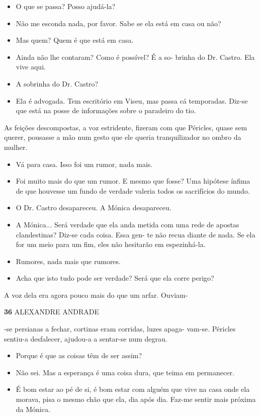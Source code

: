 \begin{itemize}
\tightlist
\item
  O que se passa? Posso ajudá-la?
\item
  Não me esconda nada, por favor. Sabe se ela está em casa ou não?
\item
  Mas quem? Quem é que está em casa.
\item
  Ainda não lhe contaram? Como é possível? É a so- brinha do Dr. Castro.
  Ela vive aqui.
\item
  A sobrinha do Dr. Castro?
\item
  Ela é advogada. Tem escritório em Viseu, mas passa cá temporadas.
  Diz-se que está na posse de informações sobre o paradeiro do tio.
\end{itemize}

As feições descompostas, a voz estridente, fizeram com que Péricles,
quase sem querer, pousasse a mão num gesto que ele queria tranquilizador
no ombro da mulher.

\begin{itemize}
\tightlist
\item
  Vá para casa. Isso foi um rumor, nada mais.
\item
  Foi muito mais do que um rumor. E mesmo que fosse? Uma hipótese ínfima
  de que houvesse um fundo de verdade valeria todos os sacrifícios do
  mundo.
\item
  O Dr. Castro desapareceu. A Mónica desapareceu.
\item
  A Mónica... Será verdade que ela anda metida com uma rede de apostas
  clandestinas? Diz-se cada coisa. Essa gen- te não recua diante de
  nada. Se ela for um meio para um fim, eles não hesitarão em
  espezinhá-la.
\item
  Rumores, nada mais que rumores.
\item
  Acha que isto tudo pode ser verdade? Será que ela corre perigo?
\end{itemize}

A voz dela era agora pouco mais do que um arfar. Ouviam-

\textbf{36 }ALEXANDRE ANDRADE

-se persianas a fechar, cortinas eram corridas, luzes apaga- vam-se.
Péricles sentiu-a desfalecer, ajudou-a a sentar-se num degrau.

\begin{itemize}
\tightlist
\item
  Porque é que as coisas têm de ser assim?
\item
  Não sei. Mas a esperança é uma coisa dura, que teima em permanecer.
\item
  É bom estar ao pé de si, é bom estar com alguém que vive na casa onde
  ela morava, pisa o mesmo chão que ela, dia após dia. Faz-me sentir
  mais próxima da Mónica.
\end{itemize}

